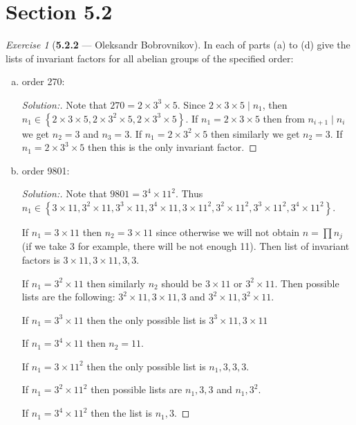 \documentclass[12pt]{amsart}
\theoremstyle{remark}
\newtheorem*{exercise}{Exercise}%
\theoremstyle{mycomment}
\begin{document}
\section*{Section 5.2}
\begin{exercise}[\textbf{5.2.2} --- Oleksandr Bobrovnikov]
  In each of parts (a) to (d) give the lists of invariant factors for all abelian groups of the specified order:
  \begin{enumerate}[(a)]
    \item order 270:
    \begin{proof}[Solution:]
      Note that $270=2\times 3^3\times 5$. Since $2\times 3\times 5\mid n_1$, then $n_1\in\left\{ 2\times 3\times 5,2\times 3^2\times 5,2\times 3^3\times 5 \right\}$.
      If $n_1=2\times 3\times 5$ then from $n_{i+1}\mid n_i$ we get $n_2=3$ and $n_3=3$.
      If $n_1=2\times 3^2\times 5$ then similarly we get $n_2=3$.
      If $n_1=2\times 3^3\times 5$ then this is the only invariant factor.
    \end{proof}
    \item order 9801:
    \begin{proof}[Solution:]
      Note that $9801=3^4\times 11^2$. Thus\\
      $n_1\in\left\{ 3\times 11,3^2\times 11,3^3\times 11,3^4\times 11,3\times 11^2,3^2\times 11^2,3^3\times 11^2,3^4\times 11^2\right\}$.
  
      If $n_1=3\times 11$ then $n_2=3\times 11$ since otherwise we will not obtain $n=\prod n_j$ (if we take 3 for example, there will be not enough 11).
      Then list of invariant factors is $3\times 11,3\times 11,3,3$.
      
      If $n_1=3^2\times 11$ then similarly $n_2$ should be $3\times 11$ or $3^2\times 11$. Then possible lists are the following: $3^2\times 11,3\times 11,3$ and $3^2\times 11,3^2\times 11$.
  
      If $n_1=3^3\times 11$ then the only possible list is $3^3\times 11,3\times 11$
  
      If $n_1=3^4\times 11$ then $n_2=11$.
  
      If $n_1=3\times 11^2$ then the only possible list is $n_1,3,3,3$.
  
      If $n_1=3^2\times 11^2$ then possible lists are $n_1,3,3$ and $n_1,3^2$.
  
      If $n_1=3^4\times 11^2$ then the list is $n_1,3$.
  

\end{proof}
\end{enumerate}
\end{exercise}
\end{document}
